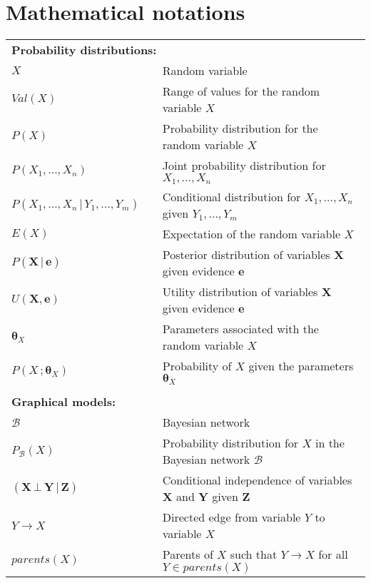 
\chapter*{Mathematical notations}
\thispagestyle{empty}
\pagestyle{empty}                                                           

\begin{longtable}{lp{5mm}p{95mm}}
\multicolumn{3}{l}{\textbf{Probability distributions:}} \vspace{2mm} \\
$X$ && Random variable \\
$\mathit{Val}(X)$ && Range of values for the random variable $X$ \\
$P(X)$ && Probability distribution for the random variable $X$ \\
$P(X_1, \dots, X_n)$ && Joint probability distribution for $X_1, \dots, X_n$ \\
$P(X_1, \dots, X_n \, | \, Y_1, \dots, Y_m)$ && Conditional distribution for $X_1, \dots, X_n$ given $Y_1, \dots, Y_m$  \\ 
$E(X)$ && Expectation of the random variable $X$ \\
 $P(\mathbf{X}  \, | \,  \mathbf{e})$ && Posterior distribution of variables $\mathbf{X}$ given evidence $\mathbf{e}$ \\ 
 $U(\mathbf{X} ,  \mathbf{e})$ && Utility distribution of variables $\mathbf{X}$ given evidence $\mathbf{e}$ \\ 
 $\boldsymbol\theta_{X}$ && Parameters associated with the random variable $X$ \\ 
 $P(X\,;\boldsymbol\theta_{X})$ && Probability of $X$ given the parameters $\boldsymbol\theta_{X}$ \\ 
 
&&  \vspace{0mm} \\
\multicolumn{3}{l}{\textbf{Graphical models:}} \vspace{2mm} \\
 $\mathcal{B}$ && Bayesian network \\
 $P_\mathcal{B}(X)$ && Probability distribution for $X$ in the Bayesian network $\mathcal{B}$ \\ 
$(\mathbf{X} \, \bot \, \mathbf{Y} \, | \, \mathbf{Z})$ && Conditional independence of variables $\mathbf{X} $ and $\mathbf{Y}$ given $\mathbf{Z}$ \\
$Y \rightarrow X$ && Directed edge from variable $Y$ to variable $X$ \\
$\mathit{parents}(X)$ && Parents of $X$ such that $Y \rightarrow X$ for all $Y\!\in\!parents(X)$ \\


\end{longtable}
